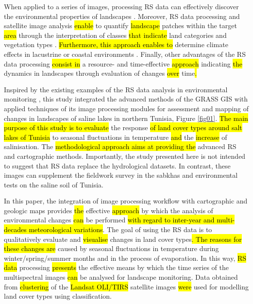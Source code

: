 \documentclass[land,article,submit,pdftex,moreauthors]{Definitions/mdpi}
\begin{document}
When applied to a series of images, processing RS data can effectively discover the environmental properties of  landscapes \cite{Toujani,Quarmby,Gelebo}. Moreover, RS data processing and satellite image analysis \hl{enable }to quantify \hl{landscape} patches within the target \hl{area} through the interpretation of classes \hl{that indicate} land categories and vegetation types \cite{Benedetti,Godinho}. \hl{Furthermore, this approach enables to} determine climate effects in lacustrine or coastal environments \cite{Souissi}. Finally, other advantages of the RS data processing \hl{consist in} a resource- and time-effective \hl{approach} indicating \hl{the }dynamics in landscapes through evaluation of changes \hl{over} time\hl{.} 

Inspired by the existing examples of the RS data analysis in environmental monitoring \cite{f9020059,Lemenkova202229,Fathalli,Abbas,Henchiri}, this study integrated the advanced methods of the GRASS GIS with applied techniques of its image processing modules for assessment and mapping of changes in landscapes of saline lakes in northern Tunisia, Figure \ref{fig01}. \hl{The main purpose of this study is to evaluate} the response \hl{of land cover types around salt lakes of Tunisia }to seasonal fluctuations in temperature \hl{and} the \hl{increase} of salinisation. The \hl{methodological approach aims at providing the} advanced RS and cartographic methods. Importantly, the study presented here is not intended to suggest that RS data replace the hydrological datasets. In contrast, these images can supplement the fieldwork survey in the sabkhas and environmental tests on the saline soil of Tunisia. 

In this paper, the integration of image processing workflow with cartographic and geologic maps provides \hl{the} effective \hl{approach} by which the analysis of environmental changes \hl{can} be performed \hl{with regard to inter-year and multi-decades meteorological variations}. The goal of using the RS data is to qualitatively evaluate and \hl{visualise} changes in land cover types\hl{. The reasons for these changes are }caused by seasonal fluctuations in temperature during winter/spring/summer months and in the process of evaporation. In this way, \hl{RS data} processing \hl{presents} the effective means by which the time series of the multispectral images \hl{can} be analysed for landscape monitoring. Data obtained from \hl{clustering} of the \hl{Landsat OLI/TIRS }satellite images \hl{were} used for modelling land cover types using classification. 
\end{document}
